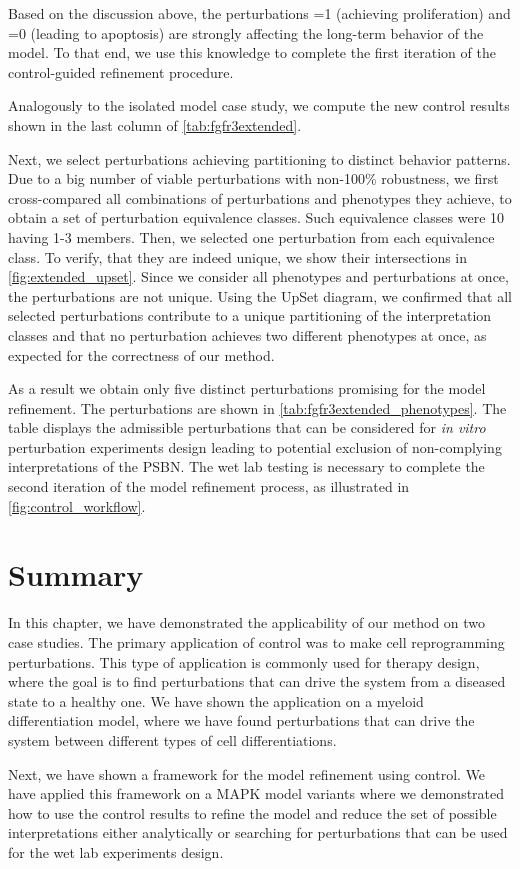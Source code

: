 Based on the discussion above, the perturbations =1 (achieving proliferation) and =0 (leading to apoptosis) are strongly affecting the long-term behavior of the model. To that end, we use this knowledge to complete the first iteration of the control-guided refinement procedure.



Analogously to the isolated model case study, we compute the new control results shown in the last column of \autoref{tab:fgfr3extended}. 


Next, we select perturbations achieving partitioning to distinct behavior patterns. Due to a big number of viable perturbations with non-100\% robustness, we first cross-compared all combinations of perturbations and phenotypes they achieve, to obtain a set of perturbation equivalence classes. Such equivalence classes were 10 having 1-3 members. Then, we selected one perturbation from each equivalence class. To verify, that they are indeed unique, we show their intersections in \autoref{fig:extended_upset}. Since we consider all phenotypes and perturbations at once, the perturbations are not unique. Using the UpSet diagram, we confirmed that all selected perturbations contribute to a unique partitioning of the interpretation classes and that no perturbation achieves two different phenotypes at once, as expected for the correctness of our method.


As a result we obtain only five distinct perturbations promising for the model refinement. The perturbations are shown in \autoref{tab:fgfr3extended_phenotypes}. The table displays the admissible perturbations that can be considered for \emph{in vitro} perturbation experiments design leading to potential exclusion of non-complying interpretations of the PSBN. The wet lab testing is necessary to complete the second iteration of the model refinement process, as illustrated in \autoref{fig:control_workflow}. 

\section{Summary}

In this chapter, we have demonstrated the applicability of our method on two case studies. The primary application of control was to make cell reprogramming perturbations. This type of application is commonly used for therapy design, where the goal is to find perturbations that can drive the system from a diseased state to a healthy one. We have shown the application on a myeloid differentiation model, where we have found perturbations that can drive the system between different types of cell differentiations.

Next, we have shown a framework for the model refinement using control. We have applied this framework on a MAPK model variants where we demonstrated how to use the control results to refine the model and reduce the set of possible interpretations either analytically or searching for perturbations that can be used for the wet lab experiments design.